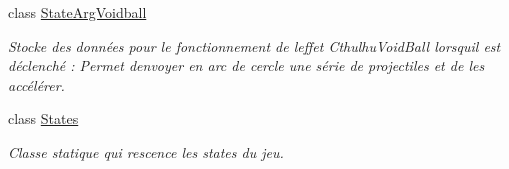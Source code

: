 \begin{DoxyCompactItemize}
class \hyperlink{class_tentacle_slicers_1_1customs_1_1_state_arg_voidball}{State\+Arg\+Voidball}
\begin{DoxyCompactList}\small\item\em Stocke des données pour le fonctionnement de l\textquotesingle{}effet Cthulhu\+Void\+Ball lorsqu\textquotesingle{}il est déclenché \+: Permet d\textquotesingle{}envoyer en arc de cercle une série de projectiles et de les accélérer. \end{DoxyCompactList}\item 
class \hyperlink{class_tentacle_slicers_1_1customs_1_1_states}{States}
\begin{DoxyCompactList}\small\item\em Classe statique qui rescence les states du jeu. \end{DoxyCompactList}\end{DoxyCompactItemize}
